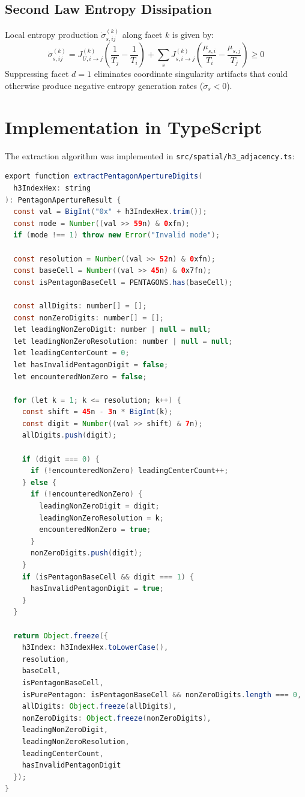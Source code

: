 \documentclass[10pt,twocolumn,a4paper]{article}
\theoremstyle{definition}
\begin{document}
\subsection{Second Law Entropy Dissipation}
Local entropy production $\dot{\sigma}_{s, ij}^{(k)}$ along facet $k$ is given by:
\begin{equation}
\dot{\sigma}_{s, ij}^{(k)} = J_{U, i \to j}^{(k)} \left( \frac{1}{T_j} - \frac{1}{T_i} \right) + \sum_{s} J_{s, i \to j}^{(k)} \left( \frac{\mu_{s, i}}{T_i} - \frac{\mu_{s, j}}{T_j} \right) \ge 0
\end{equation}
Suppressing facet $d=1$ eliminates coordinate singularity artifacts that could otherwise produce negative entropy generation rates ($\dot{\sigma}_s < 0$).

\section{Implementation in TypeScript}
The extraction algorithm was implemented in \texttt{src/spatial/h3\_adjacency.ts}:
\begin{lstlisting}[language=Java]
export function extractPentagonApertureDigits(
  h3IndexHex: string
): PentagonApertureResult {
  const val = BigInt("0x" + h3IndexHex.trim());
  const mode = Number((val >> 59n) & 0xfn);
  if (mode !== 1) throw new Error("Invalid mode");
  
  const resolution = Number((val >> 52n) & 0xfn);
  const baseCell = Number((val >> 45n) & 0x7fn);
  const isPentagonBaseCell = PENTAGONS.has(baseCell);
  
  const allDigits: number[] = [];
  const nonZeroDigits: number[] = [];
  let leadingNonZeroDigit: number | null = null;
  let leadingNonZeroResolution: number | null = null;
  let leadingCenterCount = 0;
  let hasInvalidPentagonDigit = false;
  let encounteredNonZero = false;

  for (let k = 1; k <= resolution; k++) {
    const shift = 45n - 3n * BigInt(k);
    const digit = Number((val >> shift) & 7n);
    allDigits.push(digit);

    if (digit === 0) {
      if (!encounteredNonZero) leadingCenterCount++;
    } else {
      if (!encounteredNonZero) {
        leadingNonZeroDigit = digit;
        leadingNonZeroResolution = k;
        encounteredNonZero = true;
      }
      nonZeroDigits.push(digit);
    }
    if (isPentagonBaseCell && digit === 1) {
      hasInvalidPentagonDigit = true;
    }
  }

  return Object.freeze({
    h3Index: h3IndexHex.toLowerCase(),
    resolution,
    baseCell,
    isPentagonBaseCell,
    isPurePentagon: isPentagonBaseCell && nonZeroDigits.length === 0,
    allDigits: Object.freeze(allDigits),
    nonZeroDigits: Object.freeze(nonZeroDigits),
    leadingNonZeroDigit,
    leadingNonZeroResolution,
    leadingCenterCount,
    hasInvalidPentagonDigit
  });
}
\end{lstlisting}
\end{document}
